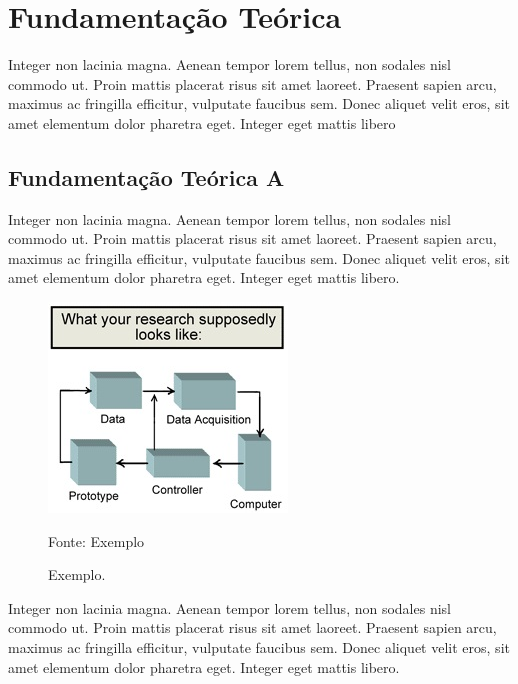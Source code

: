 \chapter{Fundamentação Teórica}
\label{cap:fundamentacao-teorica}

Integer non lacinia magna. Aenean tempor lorem tellus, non sodales nisl commodo ut. Proin mattis placerat risus sit amet laoreet. Praesent sapien arcu, maximus ac fringilla efficitur, vulputate faucibus sem. Donec aliquet velit eros, sit amet elementum dolor pharetra eget. Integer eget mattis libero

\section{Fundamentação Teórica A}
\label{sec:fundamentacao-teorica-a}

Integer non lacinia magna. Aenean tempor lorem tellus, non sodales nisl commodo ut. Proin mattis placerat risus sit amet laoreet. Praesent sapien arcu, maximus ac fringilla efficitur, vulputate faucibus sem. Donec aliquet velit eros, sit amet elementum dolor pharetra eget. Integer eget mattis libero.

\begin{figure}[htb]
    \centering\includegraphics[width=.80\textwidth]{figuras/figura-1.jpg}
    \caption{\label{fig:exemplo-18}Exemplo.}
    
    Fonte: Exemplo%
\end{figure}
	
Integer non lacinia magna. Aenean tempor lorem tellus, non sodales nisl commodo ut. Proin mattis placerat risus sit amet laoreet. Praesent sapien arcu, maximus ac fringilla efficitur, vulputate faucibus sem. Donec aliquet velit eros, sit amet elementum dolor pharetra eget. Integer eget mattis libero.

